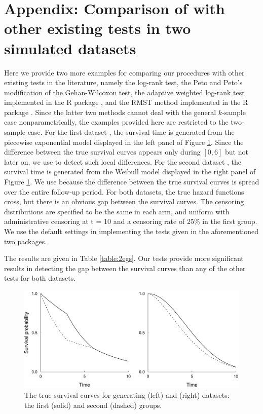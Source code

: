 \section{Appendix: Comparison of  with other existing tests in two simulated datasets} \label{app:2egs}

Here we provide two more examples for comparing our procedures with other existing tests in the literature, namely the log-rank test, the Peto and Peto's modification of the Gehan-Wilcoxon test, the adaptive weighted log-rank test implemented in  the R  package , and the RMST method implemented in  the R  package .
Since the latter two methods cannot deal with the general $k$-sample case nonparametrically, the examples provided here are restricted to the two-sample case.
For the first dataset , the survival time is generated from the piecewise exponential model displayed in the left panel of Figure \ref{fig:2egs}. %
Since the difference between the true survival curves appears only during $[0, 6]$ but not later on, we use  to detect such local differences.
For the second dataset , the survival time is generated from the Weibull model displayed %
in the right panel of Figure \ref{fig:2egs}. %
We use  because the difference between the true survival curves is spread over the entire follow-up period.
For both datasets, the true hazard functions cross, but there is an obvious gap between the survival curves.
The censoring distributions are specified to be the same in each arm, and uniform with administrative censoring at t = 10 and a censoring rate of 25\% in the first group. We use the default settings in implementing the tests given in
the aforementioned two packages.

The results are given in Table \ref{table:2egs}. Our tests provide more significant results in detecting the gap between the survival curves than any of the other tests for both datasets.
 
 \begin{figure}[H]
 	\centerline{\includegraphics[width=0.99\columnwidth]{figures/paper_EL2Surv_2egs.pdf}} %
 	\caption{
 	The true survival curves for generating  (left) and   (right) datasets: the first (solid) and second (dashed) groups.
 	}
 	\label{fig:2egs}
 \end{figure}
 
